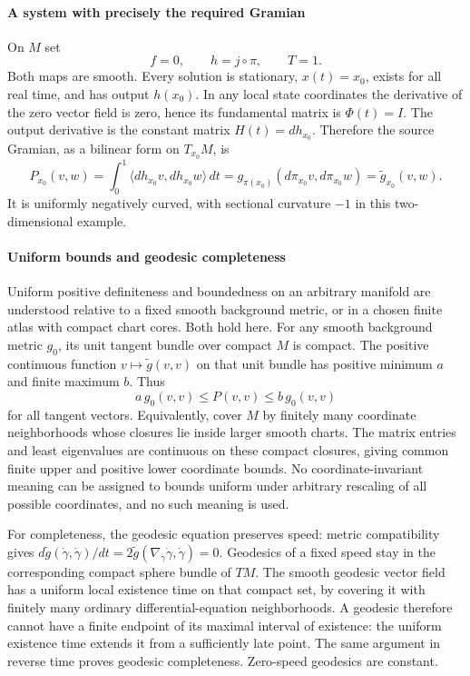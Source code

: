 \documentclass[11pt]{article}
\begin{document}
\paragraph{A system with precisely the required Gramian}
On $M$ set
\[
 f=0,\qquad h=j\circ\pi,\qquad T=1.
\]
Both maps are smooth. Every solution is stationary, $x(t)=x_0$, exists for all real time, and has output $h(x_0)$. In any local state coordinates the derivative of the zero vector field is zero, hence its fundamental matrix is $\Phi(t)=I$. The output derivative is the constant matrix $H(t)=dh_{x_0}$. Therefore the source Gramian, as a bilinear form on $T_{x_0}M$, is
\[
 P_{x_0}(v,w)=\int_0^1\langle dh_{x_0}v,dh_{x_0}w\rangle\,dt
  =g_{\pi(x_0)}(d\pi_{x_0}v,d\pi_{x_0}w)
  =\widetilde g_{x_0}(v,w).
 \tag{1}
\]
It is uniformly negatively curved, with sectional curvature $-1$ in this two-dimensional example.

\paragraph{Uniform bounds and geodesic completeness}
Uniform positive definiteness and boundedness on an arbitrary manifold are understood relative to a fixed smooth background metric, or in a chosen finite atlas with compact chart cores. Both hold here. For any smooth background metric $g_0$, its unit tangent bundle over compact $M$ is compact. The positive continuous function $v\mapsto\widetilde g(v,v)$ on that unit bundle has positive minimum $a$ and finite maximum $b$. Thus
\[
 a\,g_0(v,v)\leq P(v,v)\leq b\,g_0(v,v)
\]
for all tangent vectors. Equivalently, cover $M$ by finitely many coordinate neighborhoods whose closures lie inside larger smooth charts. The matrix entries and least eigenvalues are continuous on these compact closures, giving common finite upper and positive lower coordinate bounds. No coordinate-invariant meaning can be assigned to bounds uniform under arbitrary rescaling of all possible coordinates, and no such meaning is used.

For completeness, the geodesic equation preserves speed: metric compatibility gives $d\widetilde g(\dot\gamma,\dot\gamma)/dt=2\widetilde g(\nabla_{\dot\gamma}\dot\gamma,\dot\gamma)=0$. Geodesics of a fixed speed stay in the corresponding compact sphere bundle of $TM$. The smooth geodesic vector field has a uniform local existence time on that compact set, by covering it with finitely many ordinary differential-equation neighborhoods. A geodesic therefore cannot have a finite endpoint of its maximal interval of existence: the uniform existence time extends it from a sufficiently late point. The same argument in reverse time proves geodesic completeness. Zero-speed geodesics are constant.
\end{document}
